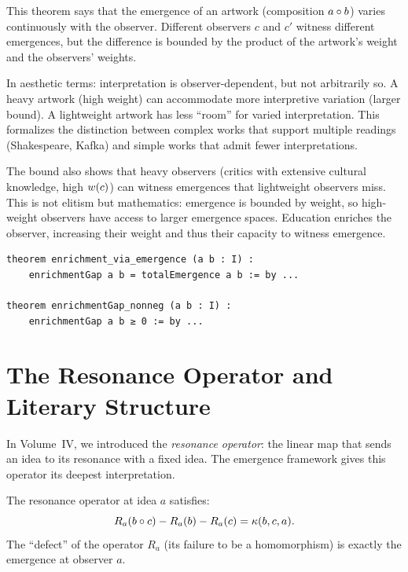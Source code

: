 \begin{interpretation}
This theorem says that the emergence of an artwork (composition $a \circ b$)
varies continuously with the observer. Different observers $c$ and $c'$ witness
different emergences, but the difference is bounded by the product of the
artwork's weight and the observers' weights.

In aesthetic terms: interpretation is observer-dependent, but not arbitrarily
so. A heavy artwork (high weight) can accommodate more interpretive variation
(larger bound). A lightweight artwork has less ``room'' for varied interpretation.
This formalizes the distinction between complex works that support multiple
readings (Shakespeare, Kafka) and simple works that admit fewer interpretations.

The bound also shows that heavy observers (critics with extensive cultural
knowledge, high $w(c)$) can witness emergences that lightweight observers
miss. This is not elitism but mathematics: emergence is bounded by weight, so
high-weight observers have access to larger emergence spaces. Education enriches
the observer, increasing their weight and thus their capacity to witness
emergence.
\end{interpretation}

\begin{lstlisting}[caption={Enrichment via emergence (IDT\_v3\_Emergence.lean)}]
theorem enrichment_via_emergence (a b : I) :
    enrichmentGap a b = totalEmergence a b := by ...

theorem enrichmentGap_nonneg (a b : I) :
    enrichmentGap a b ≥ 0 := by ...
\end{lstlisting}


\section{The Resonance Operator and Literary Structure}

In Volume~IV, we introduced the \emph{resonance operator}: the linear map that
sends an idea to its resonance with a fixed idea. The emergence framework
gives this operator its deepest interpretation.

\begin{theorem}
\label{thm:operator-defect}
The resonance operator at idea $a$ satisfies:
\[
  R_a(b \circ c) - R_a(b) - R_a(c) = \kappa(b, c, a).
\]
The ``defect'' of the operator $R_a$ (its failure to be a homomorphism) is
exactly the emergence at observer $a$.
\end{theorem}

